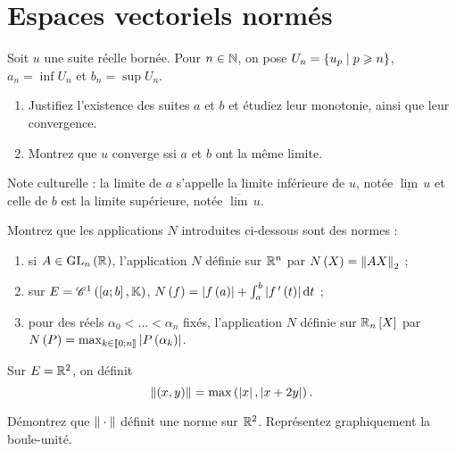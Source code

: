 \chapter{Espaces vectoriels normés}

\legendeexercices

\begin{exopss}[Exercice 1]
Soit \(u\) une suite réelle bornée. Pour \(n\in\mathbb{N}\), on pose \(U_n=\left\lbrace u_p\;\middle|\; p\geqslant n\right\rbrace\), \(a_n=\inf U_n\) et \(b_n=\sup U_n\).

\begin{enumerate}
    \item Justifiez l'existence des suites \(a\) et \(b\) et étudiez leur monotonie, ainsi que leur convergence. \\
    \item Montrez que \(u\) converge ssi \(a\) et \(b\) ont la même limite.
\end{enumerate}

Note culturelle : la limite de \(a\) s'appelle la limite inférieure de \(u\), notée \(\underline{\lim}\,u\) et celle de \(b\) est la limite supérieure, notée \(\overline{\lim}\,u\).
\end{exopss}

\begin{exops}[Exercice 2]\label{exo:1.2}
Montrez que les applications \(N\) introduites ci-dessous sont des normes :

\begin{enumerate}
    \item si \(A\in\GL{n}[\R]\), l'application \(N\) définie sur \(\mathbb{R}^n\) par \(N\paren{X}=\norme{AX}_2\) ; \\
    \item sur \(E=\mathscr{C}^{1}\left(\left[a;b\right],\mathbb{K}\right)\), \(N\paren{f}=\abs{f\paren{a}}+\int_a^b\abs{f\prim\paren{t}}\odif{t}\) ; \\
    \item pour des réels \(\alpha_0<\dots<\alpha_n\) fixés, l'application \(N\) définie sur \(\polydeg[\R]{n}\) par \(N\left(P\right)=\max_{k\in\left\llbracket0;n\right\rrbracket}\left\lvert P\left(\alpha_k\right)\right\rvert\).
\end{enumerate}
\end{exops}

\begin{exos}[Exercice 3]
Sur \(E=\mathbb{R}^2\), on définit \[\norme{\paren{x,y}}=\max\paren{\abs{x},\abs{x+2y}}.\]

Démontrez que \(\norme{}\) définit une norme sur \(\mathbb{R}^2\). Représentez graphiquement la boule-unité.
\end{exos}

